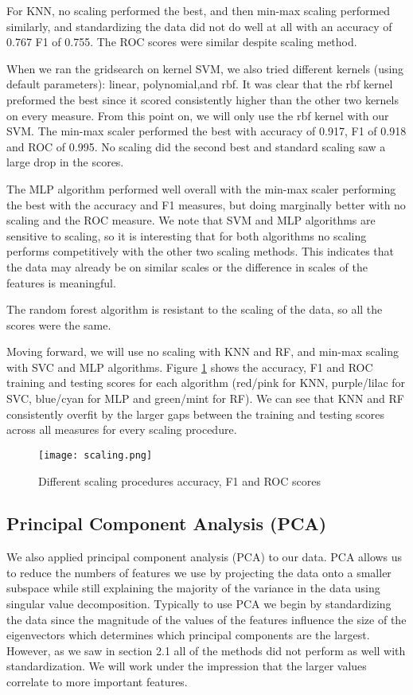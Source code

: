 \documentclass[12pt]{article}
\begin{document}
For KNN, no scaling performed the best, and then min-max scaling performed similarly, and standardizing the data did not do well at all with an accuracy of 0.767 F1 of 0.755. The ROC scores were similar despite scaling method.

When we ran the gridsearch on kernel SVM, we also tried different kernels (using default parameters): linear, polynomial,and rbf.  It was clear that the rbf kernel preformed the best since it scored consistently higher than the other two kernels on every measure. From this point on, we will only use the rbf kernel with our SVM. The min-max scaler performed the best with accuracy of 0.917, F1 of 0.918 and ROC of 0.995. No scaling did the second best and standard scaling saw a large drop in the scores.

The MLP algorithm performed well overall with the min-max scaler performing the best with the accuracy and F1 measures, but doing marginally better with no scaling and the ROC measure. We note that SVM and MLP algorithms are sensitive to scaling, so it is interesting that for both algorithms no scaling performs competitively with the other two scaling methods. This indicates that the data may already be on similar scales or the difference in scales of the features is meaningful.

The random forest algorithm is resistant to the scaling of the data, so all the scores were the same.

Moving forward, we will use no scaling with KNN and RF, and min-max scaling with SVC and MLP algorithms. Figure \ref{scaling} shows the accuracy, F1 and ROC training and testing scores for each algorithm (red/pink for KNN, purple/lilac for SVC, blue/cyan for MLP and green/mint for RF). We can see that KNN and RF consistently overfit by the larger gaps between the training and testing scores across all measures for every scaling procedure.

\begin{figure}[h]
	\centering
	\texttt{[image: scaling.png]}
	\caption{Different scaling procedures accuracy, F1 and ROC scores}
	\label{scaling}
\end{figure}

\FloatBarrier

\subsection{Principal Component Analysis (PCA)}

We also applied principal component analysis (PCA) to our data. PCA allows us to reduce the numbers of features we use by projecting the data onto a smaller subspace while still explaining the majority of the variance in the data using singular value decomposition. Typically to use PCA we begin by standardizing the data since the magnitude of the values of the features influence the size of the eigenvectors which determines which principal components are the largest. However, as we saw in section 2.1 all of the methods did not perform as well with standardization. We will work under the impression that the larger values correlate to more important features. 
\end{document}
